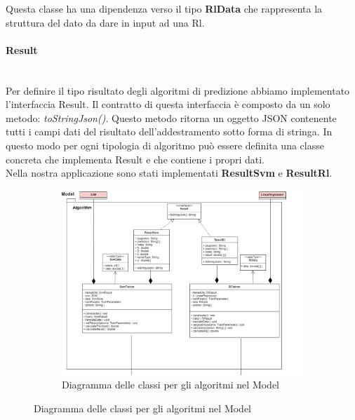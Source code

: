		Questa classe ha una dipendenza verso il tipo \textbf{RlData} che rappresenta la struttura del dato da dare in input ad una Rl\glo.
		\paragraph*{Result} \mbox{} \\[1mm]
		Per definire il tipo risultato degli algoritmi di predizione abbiamo implementato l'interfaccia Result. Il contratto di questa interfaccia è composto da un solo metodo: \textit{toStringJson()}. Questo metodo ritorna un oggetto JSON contenente tutti i campi dati del risultato dell'addestramento sotto forma di stringa. In questo modo per ogni tipologia di algoritmo può essere definita una classe concreta che implementa Result e che contiene i propri dati. \\
		Nella nostra applicazione sono stati implementati \textbf{ResultSvm} e \textbf{ResultRl}.
		\mbox{}
		\begin{landscape}
			\begin{figure}
				\begin{figure} [H]
					\includegraphics[width=\linewidth]{img/Diagrammi/algorithm-app.png}
					\caption{Diagramma delle classi per gli algoritmi nel Model}
				\end{figure}
			\end{figure}
		\end{landscape}
